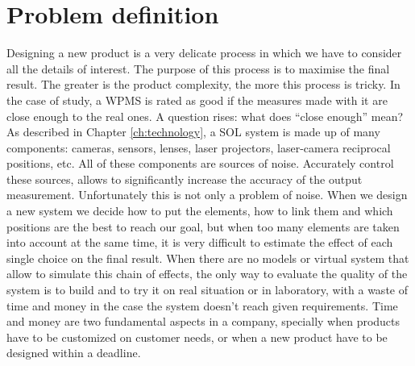 \section{Problem definition}
Designing a new product is a very delicate process in which we have to consider all the details of interest. The purpose of this process is to maximise the final result. The greater is the product complexity, the more this process is tricky. In the case of study, a \acs{WPMS} is rated as good if the measures made with it are close enough to the real ones. A question rises: what does ``close enough'' mean? \\

As described in Chapter \ref{ch:technology}, a \acs{SOL} system is made up of many components: cameras, sensors, lenses, laser projectors, laser-camera reciprocal positions, etc. All of these components are sources of noise. Accurately control these sources, allows to significantly increase the accuracy of the output measurement. Unfortunately this is not only a problem of noise. When we design a new system we decide how to put the elements, how to link them and which positions are the best to reach our goal, but when too many elements are taken into account at the same time, it is very difficult to estimate the effect of each single choice on the final result. When there are no models or virtual system that allow to simulate this chain of effects, the only way to evaluate the quality of the system is to build and to try it on real situation or in laboratory, with a waste of time and money in the case the system doesn't reach given requirements. Time and money are two fundamental aspects in a company, specially when products have to be customized on customer needs, or when a new product have to be designed within a deadline. \\

